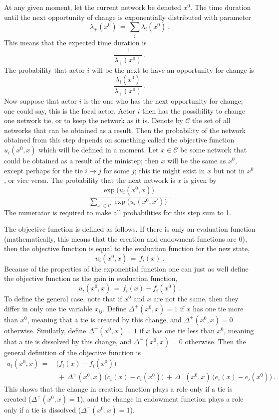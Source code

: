 \documentclass[a4paper,fleqn,11pt]{article}
\newcommand{\+}{\, + \,}
\begin{document}
At any given moment, let the current network be denoted $x^0$.
The time duration until the next opportunity of change
is exponentially distributed with parameter
\[
  \lambda_+(x^0) \,=\, \sum_i \lambda_i(x^0) \ .
\]
This means that the expected time duration is
\[
   \frac{1}{\lambda_+(x^0)} \ .
\]
The probability that actor $i$ will be the next to
have an opportunity for change is
\[
  \frac{\lambda_i(x^0)}{\lambda_+(x^0)} \ .
\]
Now suppose that actor $i$ is the one who has the next opportunity
for change; one could say, this is the focal actor.
Actor $i$ then has the possibility to change one network tie,
or to keep the network as it is.
Denote by $\mathcal C$ the set of all networks that can be obtained
as a result.
Then the probability of the network obtained from this step depends on
something called the objective function $u_i(x^0, x)$ which will be defined
in a moment.
Let $x \in \mathcal C$ be some network that could be obtained as a result
of the ministep; then $x$ will be the same as $x^0$, except perhaps for
the tie $i \rightarrow j$ for some $j$; this tie might exist in $x$ but not in
$x^0$, or vice versa.
The probability that the next network is $x$ is given by
\begin{equation}
     \frac{\exp(u_i(x^0, x)\big)}
          {\sum_{x' \in \mathcal C} \exp\big(u_i(x^0, x')\big)} \ . \label{probab}
\end{equation}
The numerator is required to make all probabilities for this step sum to 1.

The objective function is defined as follows.
If there is only an evaluation function (mathematically, this means that
the creation and endowment functions are 0), then
the objective function is equal to the evaluation function for the new state,
\[
   u_i(x^0, x) \,=\, f_i(x) \ .
\]
Because of the properties of the exponential function one can just as
well define the objective function as the gain in evaluation function,
\begin{equation}
   u_i(x^0, x) \,=\, f_i(x) - f_i(x^0) \ .    \label{gain}
\end{equation}
To define the general case, note that if $x^0$ and $x$ are not the same,
then they differ in only one tie variable $x_{ij}$.
Define  $\Delta^+(x^0, x) = 1$ if $x$ has one tie more than $x^0$,
meaning that a tie is created by this change, and $\Delta^+(x^0, x) = 0$
otherwise.
Similarly, define  $\Delta^-(x^0, x) = 1$ if $x$ has one tie less than $x^0$,
meaning that a tie is dissolved by this change, and $\Delta^-(x^0, x) = 0$
otherwise.
Then the general definition of the objective function is
\begin{align}
   u_i(x^0, x)  \,=\,  \label{u_i}   &
      \big(f_i(x) -  f_i(x^0)\big)  \\
                &   \,+\,   \Delta^+(x^0, x)\,\big(c_i(x) - c_i(x^0)\big)
                   \,+\,  \Delta^-(x^0, x)\,\big(e_i(x) - e_i(x^0)\big)    \ . \nonumber
\end{align}
This shows that the change in creation function plays a role
only if a tie is created ($\Delta^+(x^0,x) = 1$), and the change in
endowment function plays a role
only if a tie is dissolved ($\Delta^-(x^0,x) = 1$).
\end{document}
